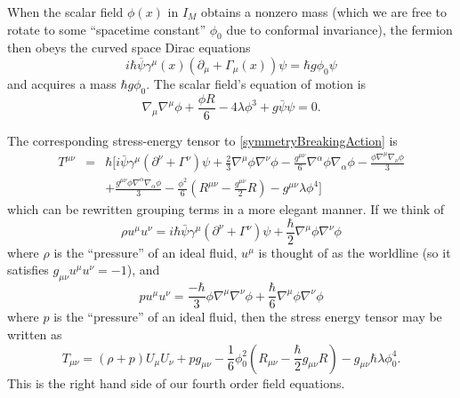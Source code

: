 When the scalar field $\phi(x)$ in $I_M$ obtains a nonzero mass (which
we are free to rotate to some ``spacetime constant'' $\phi_{0}$ due to
conformal invariance), the fermion then obeys the curved space Dirac
equations
\begin{equation}
i\hbar\overline{\psi}\gamma^{\mu}(x)(\partial_{\mu}
+ \Gamma_{\mu}(x))\psi = \hbar g\phi_{0}\psi
\end{equation}
and acquires a mass $\hbar g\phi_{0}$. The scalar field's equation of
motion is
\begin{equation}
\nabla_{\mu}\nabla^{\mu} \phi + \frac{\phi R}{6} - 4\lambda \phi^{3} +
g\bar{\psi}\psi = 0.
\end{equation}

The corresponding stress-energy tensor to \eqref{symmetryBreakingAction} is
\begin{eqnarray}
T^{\mu\nu} &=& \hbar\Big[i\bar{\psi}\gamma^\mu(\partial^\nu
+ \Gamma^\nu)\psi + \frac{2}{3}\nabla^{\mu}\phi\nabla^{\nu}\phi
- \frac{g^{\mu\nu}}{6}\nabla^{\alpha}\phi\nabla_{\alpha}\phi
-\frac{\phi\nabla^{\mu}\nabla_{\nu}\phi}{3} \nonumber\\
& & + \frac{g^{\mu\nu}\phi\nabla^{\alpha}\nabla_{\alpha}\phi}{3}
- \frac{\phi^2}{6}(R^{\mu\nu} -\frac{g^{\mu\nu}}{2}R) - g^{\mu\nu}\lambda\phi^{4}\Big]
\end{eqnarray}
which can be rewritten grouping terms in a more elegant manner. If we
think of 
\begin{equation}
\rho u^\mu u^\nu = i\hbar\bar{\psi}\gamma^\mu(\partial^\nu
+ \Gamma^\nu)\psi + \frac{\hbar}{2}\nabla^{\mu}\phi\nabla^{\nu}\phi
\end{equation}
where $\rho$ is the ``pressure'' of an ideal fluid, $u^\mu$ is thought of
as the worldline (so it satisfies $g_{\mu\nu}u^\mu u^\nu=-1$), and
\begin{equation}
pu^\mu u^\nu = \frac{-\hbar}{3}\phi\nabla^{\mu}\nabla^{\nu}\phi + \frac{\hbar}{6}\nabla^{\mu}\phi\nabla^{\nu}\phi
\end{equation}
where $p$ is the ``pressure'' of an ideal fluid, then the stress
energy tensor may be written as
\begin{equation}\label{stressEnergyTensorConformalCosmology}
T_{\mu\nu} = (\rho + p)U_{\mu}U_{\nu} + pg_{\mu\nu} -
\frac{1}{6}\phi_{0}^{2}\left(R_{\mu\nu} -
\frac{\hbar}{2}g_{\mu\nu}R\right) - g_{\mu\nu}\hbar\lambda \phi_{0}^{4}.
\end{equation}
This is the right hand side of our fourth order field equations.

